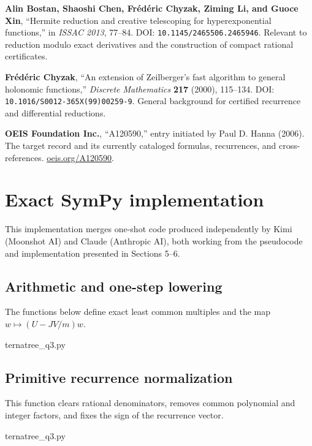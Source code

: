 \documentclass[11pt,fleqn]{article}
\theoremstyle{plain}
\begin{document}
\begin{sloppypar}
\begin{enumerate}[label={[\arabic*]},leftmargin=2.4em,itemsep=0.52em]
\item \textbf{Alin Bostan, Shaoshi Chen, Fr\'ed\'eric Chyzak, Ziming Li,
and Guoce Xin}, ``Hermite reduction and creative telescoping for
hyperexponential functions,'' in \emph{ISSAC 2013}, 77--84. DOI:
\nolinkurl{10.1145/2465506.2465946}. Relevant to reduction modulo exact
derivatives and the construction of compact rational certificates.

\item \textbf{Fr\'ed\'eric Chyzak}, ``An extension of Zeilberger's fast
algorithm to general holonomic functions,'' \emph{Discrete Mathematics}
\textbf{217} (2000), 115--134. DOI:
\nolinkurl{10.1016/S0012-365X(99)00259-9}. General background for certified
recurrence and differential reductions.

\item \textbf{OEIS Foundation Inc.}, ``A120590,'' entry initiated by
Paul D. Hanna (2006). The target record and its currently cataloged formulas,
recurrences, and cross-references.
\href{https://oeis.org/A120590}{oeis.org/A120590}.
\end{enumerate}
\end{sloppypar}

	\appendix
	\section{Exact SymPy implementation}
	
	This implementation merges one-shot code produced independently by Kimi (Moonshot AI) and Claude (Anthropic AI), both working from the pseudocode and implementation presented in Sections 5--6.
	
	\subsection{Arithmetic and one-step lowering}
	The functions below define exact least common multiples and the map
	$w\mapsto (U-JV/m)w$.
	\par\medskip\noindent
	\begin{minipage}[t]{\textwidth}
	
	{ternatree_q3.py}
	\end{minipage}
	
	\clearpage
	\subsection{Primitive recurrence normalization}
	This function clears rational denominators, removes common polynomial and
	integer factors, and fixes the sign of the recurrence vector.
	\par\medskip\noindent
	\begin{minipage}[t]{\textwidth}
	
	{ternatree_q3.py}
	\end{minipage}
	
\end{document}
